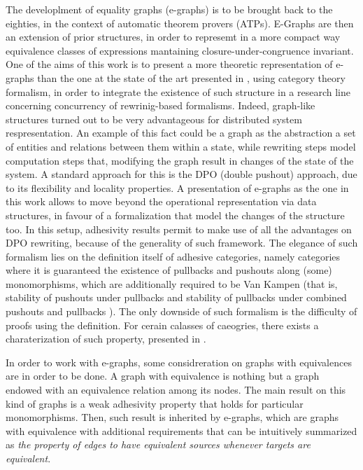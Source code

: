 The developlment of equality graphs (e-graphs) is to be brought back to the eighties, in the context of automatic theorem provers (ATPs). E-Graphs are then an extension of prior structures, in order to represemt in a more compact way equivalence classes of expressions mantaining closure-under-congruence invariant.
One of the aims of this work is to present a more theoretic representation of e-graphs than the one at the state of the art presented in \cite{egg}, using category theory formalism, in order to integrate the existence of such structure in a research line concerning concurrency of rewrinig-based formalisms.
Indeed, graph-like structures turned out to be very advantageous for distributed system respresentation.
An example of this fact could be a graph as the abstraction a set of entities and relations between them within a state, while rewriting steps model computation steps that, modifying the graph result in changes of the state of the system.
A standard approach for this is the DPO (double pushout) approach, due to its flexibility and locality properties.
A presentation of e-graphs as the one in this work allows to move beyond the operational representation via data structures, in favour of a formalization that model the changes of the structure too.
In this setup, adhesivity results permit to make use of all the advantages on DPO rewriting, because of the generality of such framework.
The elegance of such formalism lies on the definition itself of adhesive categories, namely categories where it is guaranteed the existence of pullbacks and pushouts along (some) monomorphisms, which are additionally required to be Van Kampen (that is, stability of pushouts under pullbacks and stability of pullbacks under combined pushouts and pullbacks \cite{Ehrig_Golas}).
The only downside of such formalism is the difficulty of proofs using the definition. For cerain calasses of caeogries, there exists a charaterization of such property, presented in \cite{castelnovo2022newcriterionmathcalmmathcalnadhesivity}.


In order to work with e-graphs, some considreration on graphs with equivalences are in order to be done. A graph with equivalence is nothing but a graph endowed with an equivalence relation among its nodes. The main result on this kind of graphs is a weak adhesivity property that holds for particular monomorphisms. Then, such result is inherited by e-graphs, which are graphs with equivalence with additional requirements that can be intuitively summarized as \textit{the property of edges to have equivalent sources whenever targets are equivalent}.

